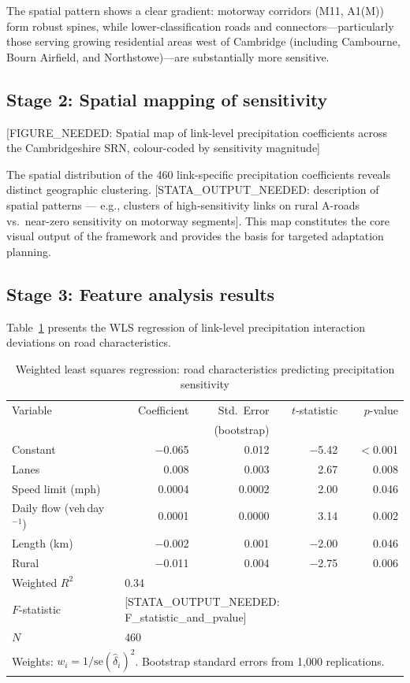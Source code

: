 \documentclass[review]{elsarticle}
\begin{document}
The spatial pattern shows a clear gradient: motorway corridors (M11, A1(M)) form robust spines, while lower-classification roads and connectors---particularly those serving growing residential areas west of Cambridge (including Cambourne, Bourn Airfield, and Northstowe)---are substantially more sensitive.


\subsection{Stage 2: Spatial mapping of sensitivity}

[FIGURE\_NEEDED: Spatial map of link-level precipitation coefficients across the Cambridgeshire SRN, colour-coded by sensitivity magnitude]

The spatial distribution of the 460 link-specific precipitation coefficients reveals distinct geographic clustering. [STATA\_OUTPUT\_NEEDED: description of spatial patterns --- e.g., clusters of high-sensitivity links on rural A-roads vs.\ near-zero sensitivity on motorway segments]. This map constitutes the core visual output of the framework and provides the basis for targeted adaptation planning.

\subsection{Stage 3: Feature analysis results}
\label{sec:results:feature}

Table~\ref{tab:wls} presents the WLS regression of link-level precipitation interaction deviations on road characteristics.

\begin{table}[htbp]
\centering
\caption{Weighted least squares regression: road characteristics predicting precipitation sensitivity}
\label{tab:wls}
\begin{tabular}{lrrrr}
\toprule
Variable & Coefficient & Std.\ Error & $t$-statistic & $p$-value \\
 & & (bootstrap) & & \\
\midrule
Constant & $-$0.065 & 0.012 & $-$5.42 & $<$0.001 \\
Lanes & 0.008 & 0.003 & 2.67 & 0.008 \\
Speed limit (mph) & 0.0004 & 0.0002 & 2.00 & 0.046 \\
Daily flow (veh\,day$^{-1}$) & 0.0001 & 0.0000 & 3.14 & 0.002 \\
Length (km) & $-$0.002 & 0.001 & $-$2.00 & 0.046 \\
Rural & $-$0.011 & 0.004 & $-$2.75 & 0.006 \\
\midrule
Weighted $R^2$ & \multicolumn{4}{l}{0.34} \\
$F$-statistic & \multicolumn{4}{l}{[STATA\_OUTPUT\_NEEDED: F\_statistic\_and\_pvalue]} \\
$N$ & \multicolumn{4}{l}{460} \\
\bottomrule
\multicolumn{5}{l}{\footnotesize Weights: $w_i = 1/\text{se}(\hat{\delta}_i)^2$. Bootstrap standard errors from 1{,}000 replications.} \\
\end{tabular}
\end{table}
\end{document}
